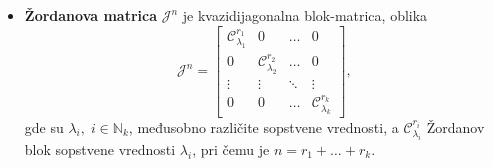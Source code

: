 \documentclass[a4paper,12pt,twoside]{report}
\numberwithin{algorithm}{section}
\begin{document}
\begin{itemize}
    vrednosti $\lambda$, t.d. $s1 \geq \dots \geq s_l$ i $r = s_1 + \dots + s_l$. Važi i 
    \[ \mu_{\mathcal{C}_\lambda^r}(t) = (t - \lambda)^{s_1} \;\land\; \kappa_{\mathcal{C}_\lambda^r}(t) = (-1)^r(t-\lambda)^r. \]
    \item \textbf{Žordanova matrica} $\mathcal{J}^n$ je kvazidijagonalna blok-matrica, oblika
    \[ \mathcal{J}^n = \begin{bmatrix}
        \mathcal{C}_{\lambda_1}^{r_1} & 0 & \dots & 0 \\
        0 & \mathcal{C}_{\lambda_2}^{r_2} & \dots & 0 \\
        \vdots & \vdots & \ddots & \vdots \\
        0 & 0 & \dots & \mathcal{C}_{\lambda_k}^{r_k}
    \end{bmatrix},  \] gde su $\lambda_i, \; i \in \mathbb{N}_k$, međusobno različite sopstvene vrednosti, a $\mathcal{C}_{\lambda_i}^{r_i}$ Žordanov blok sopstvene vrednosti $\lambda_i$,
    pri čemu je $n = r_1 + \dots + r_k$.
\end{itemize}
\end{document}
